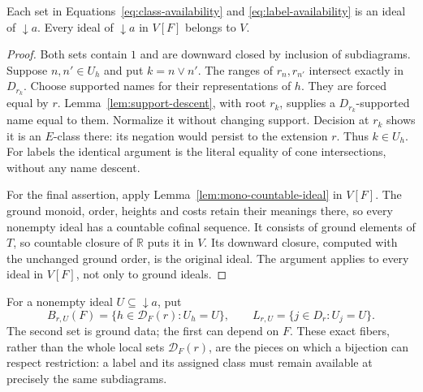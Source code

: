 \begin{lemma}\label{lem:availability-ideals}
Each set in Equations~\eqref{eq:class-availability} and
\eqref{eq:label-availability} is an ideal of $\downarrow a$.
Every ideal of $\downarrow a$ in $V[F]$ belongs to $V$.
\end{lemma}
\begin{proof}
Both sets contain $1$ and are downward closed by inclusion of
subdiagrams. Suppose $n,n'\in U_h$ and put $k=n\vee n'$. The ranges
of $r_n,r_{n'}$ intersect exactly in $D_{r_k}$. Choose supported names
for their representations of $h$. They are forced equal by $r$.
Lemma~\ref{lem:support-descent}, with root $r_k$, supplies a
$D_{r_k}$-supported name equal to them. Normalize it without changing
support. Decision at $r_k$ shows it is an $E$-class there: its
negation would persist to the extension $r$. Thus $k\in U_h$.
For labels the identical argument is the literal equality of cone
intersections, without any name descent.

For the final assertion, apply Lemma~\ref{lem:mono-countable-ideal}
in $V[F]$. The ground monoid, order, heights and costs retain their
meanings there, so every nonempty ideal has a countable cofinal sequence.
It consists of ground elements of $T$, so countable closure of
$\mathbb R$ puts it in $V$. Its downward closure, computed with the
unchanged ground order, is the original ideal. The argument applies
to every ideal in $V[F]$, not only to ground ideals.
\end{proof}

For a nonempty ideal $U\subseteq\downarrow a$, put
\[
 B_{r,U}(F)=\{h\in\mathcal D_F(r):U_h=U\},\qquad
 L_{r,U}=\{j\in D_r:U_j=U\}.
\]
The second set is ground data; the first can depend on $F$.
These exact fibers, rather than the whole local sets $\mathcal D_F(r)$,
are the pieces on which a bijection can respect restriction: a label
and its assigned class must remain available at precisely the same
subdiagrams.

